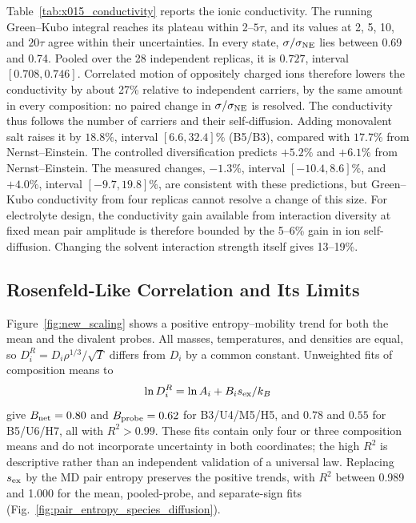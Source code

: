 \documentclass[aps,pre,twocolumn,superscriptaddress,floatfix]{revtex4-2}
\begin{document}
Table~\ref{tab:x015_conductivity} reports the ionic conductivity. The running Green--Kubo integral reaches its plateau within 2--$5\tau$, and its values at 2, 5, 10, and $20\tau$ agree within their uncertainties. In every state, $\sigma/\sigma_{\rm NE}$ lies between 0.69 and 0.74. Pooled over the 28 independent replicas, it is $0.727$, interval $[0.708,0.746]$. Correlated motion of oppositely charged ions therefore lowers the conductivity by about 27\% relative to independent carriers, by the same amount in every composition: no paired change in $\sigma/\sigma_{\rm NE}$ is resolved. The conductivity thus follows the number of carriers and their self-diffusion. Adding monovalent salt raises it by $18.8\%$, interval $[6.6,32.4]\%$ (B5/B3), compared with $17.7\%$ from Nernst--Einstein. The controlled diversification predicts $+5.2\%$ and $+6.1\%$ from Nernst--Einstein. The measured changes, $-1.3\%$, interval $[-10.4,8.6]\%$, and $+4.0\%$, interval $[-9.7,19.8]\%$, are consistent with these predictions, but Green--Kubo conductivity from four replicas cannot resolve a change of this size. For electrolyte design, the conductivity gain available from interaction diversity at fixed mean pair amplitude is therefore bounded by the 5--6\% gain in ion self-diffusion. Changing the solvent interaction strength itself gives 13--19\%.



\subsection{Rosenfeld-Like Correlation and Its Limits}

Figure~\ref{fig:new_scaling} shows a positive entropy--mobility trend for both the mean and the divalent probes. All masses, temperatures, and densities are equal, so $D_i^R=D_i\rho^{1/3}/\sqrt{T}$ differs from $D_i$ by a common constant. Unweighted fits of composition means to
\begin{equation}
\ln D_i^R=\ln A_i+B_i s_{\rm ex}/k_B
\label{eq:new_scaling}
\end{equation}
give $B_{\rm net}=0.80$ and $B_{\rm probe}=0.62$ for B3/U4/M5/H5, and $0.78$ and $0.55$ for B5/U6/H7, all with $R^2>0.99$. These fits contain only four or three composition means and do not incorporate uncertainty in both coordinates; the high $R^2$ is descriptive rather than an independent validation of a universal law. Replacing $s_{\rm ex}$ by the MD pair entropy preserves the positive trends, with $R^2$ between 0.989 and 1.000 for the mean, pooled-probe, and separate-sign fits (Fig.~\ref{fig:pair_entropy_species_diffusion}).
\end{document}
